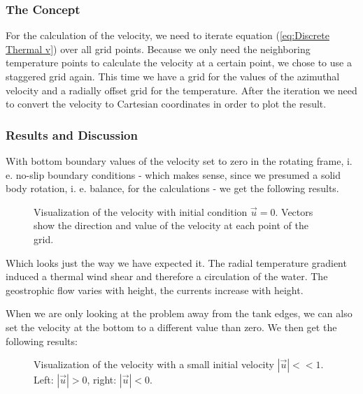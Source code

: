 \documentclass[12pt, a4paper]{article} %
\newcommand{\todoFormat}{\todo[color=blue!20]}
\begin{document}
		
		\subsubsection{The Concept}  %
			For the calculation of the velocity, we need to iterate equation (\ref{eq:Discrete Thermal v}) over all grid points. Because we only need the neighboring temperature points to calculate the velocity at a certain point, we chose to use a staggered grid again. This time we have a grid for the values of the azimuthal velocity and a radially offset grid for the temperature. After the iteration we need to convert the velocity to Cartesian coordinates in order to plot the result.
			
		\subsubsection{Results and Discussion}
			With bottom boundary values of the velocity set to zero in the rotating frame, i. e. no-slip boundary conditions - which makes sense, since we presumed a solid body rotation, i. e. balance, for the calculations - we get the following results.
			
			\begin{figure}[h]
				\centering
					\qquad
				\caption{Visualization of the velocity with initial condition $\vec{u}=0$. Vectors show the direction and value of the velocity at each point of the grid.}
			\end{figure}
			
			Which looks just the way we have expected it. The radial temperature gradient induced a thermal wind shear and therefore a circulation of the water. The geostrophic flow varies with height, the currents increase with height.
			
			When we are only looking at the problem away from the tank edges, we can also set the velocity  at the bottom to a different value than zero. We then get the following results:
			\todoFormat{anders schreiben}
			
			\begin{figure}[ht]
				\centering
					\qquad
				\caption{Visualization of the velocity with a small initial velocity $|\vec{u}|<<1$. Left: $|\vec{u}|>0$, right: $|\vec{u}|<0$.}
			\end{figure}
			
\end{document}
